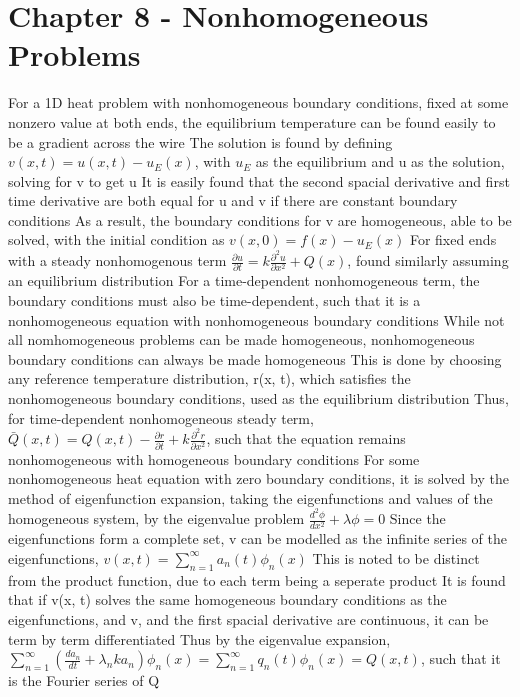\documentclass[11 pt, twoside]{article}
\newenvironment{outline*}
{
	\begin{outline}[enumerate]
	}
	{\end{outline}
}
\newcommand\pd[2]{\frac{\partial #1}{\partial #2}}
\begin{document}
\section{Chapter 8 - Nonhomogeneous Problems}
\begin{outline*}
\1 For a 1D heat problem with nonhomogeneous boundary conditions, fixed at some nonzero value at both ends, the equilibrium temperature can be found easily to be a gradient across the wire
	\2 The solution is found by defining $v(x, t) = u(x, t) - u_E(x)$, with $u_E$ as the equilibrium and u as the solution, solving for v to get u
		\3 It is easily found that the second spacial derivative and first time derivative are both equal for u and v if there are constant boundary conditions
		\3 As a result, the boundary conditions for v are homogeneous, able to be solved, with the initial condition as $v(x, 0) = f(x) - u_E(x)$
	\2 For fixed ends with a steady nonhomogenous term $\pd{u}{t} = k\pd{^2u}{x^2} + Q(x)$, found similarly assuming an equilibrium distribution
		\3 For a time-dependent nonhomogeneous term, the boundary conditions must also be time-dependent, such that it is a nonhomogeneous equation with nonhomogeneous boundary conditions
	\2 While not all nomhomogeneous problems can be made homogeneous, nonhomogeneous boundary conditions can always be made homogeneous
		\3 This is done by choosing any reference temperature distribution, r(x, t), which satisfies the nonhomogeneous boundary conditions, used as the equilibrium distribution
		\3 Thus, for time-dependent nonhomogeneous steady term, $\bar{Q}(x, t) = Q(x, t) - \pd{r}{t} + k\pd{^2r}{x^2}$, such that the equation remains nonhomogeneous with homogeneous boundary conditions
\1 For some nonhomogeneous heat equation with zero boundary conditions, it is solved by the method of eigenfunction expansion, taking the eigenfunctions and values of the homogeneous system, by the eigenvalue problem $\frac{d^2\phi}{dx^2} + \lambda\phi = 0$
	\2 Since the eigenfunctions form a complete set, v can be modelled as the infinite series of the eigenfunctions, $v(x, t) = \sum_{n = 1}^{\infty} a_n(t)\phi_n(x)$
		\3 This is noted to be distinct from the product function, due to each term being a seperate product
	\2 It is found that if v(x, t) solves the same homogeneous boundary conditions as the eigenfunctions, and v, and the first spacial derivative are continuous, it can be term by term differentiated
	\2 Thus by the eigenvalue expansion, $\sum_{n = 1}^{\infty} (\frac{da_n}{dt} + \lambda_n k a_n) \phi_n(x) = \sum_{n = 1}^{\infty} q_n(t) \phi_n(x) = Q(x, t)$, such that it is the Fourier series of Q

\end{outline*}
\end{document}
